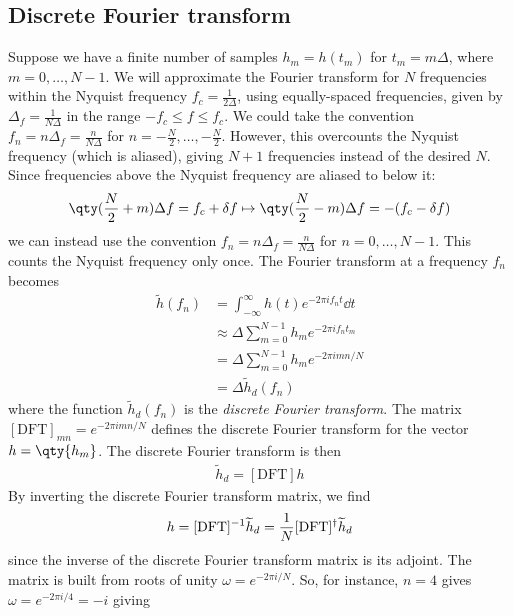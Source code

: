 \subsection{Discrete Fourier transform}
Suppose we have a finite number of samples $h_m = h(t_m)$ for $t_m = m \Delta$, where $m = 0,\dots, N-1$.
We will approximate the Fourier transform for $N$ frequencies within the Nyquist frequency $f_c = \frac{1}{2\Delta}$, using equally-spaced frequencies, given by $\Delta_f = \frac{1}{N\Delta}$ in the range $-f_c \leq f \leq f_c$.
We could take the convention $f_n = n \Delta_f = \frac{n}{N\Delta}$ for $n = -\frac{N}{2}, \dots, -\frac{N}{2}$.
However, this overcounts the Nyquist frequency (which is aliased), giving $N + 1$ frequencies instead of the desired $N$.
Since frequencies above the Nyquist frequency are aliased to below it:
\begin{align*}
	\qty(\frac{N}{2} + m) \Delta f = f_c + \delta f \mapsto \qty(\frac{N}{2} - m)\Delta f = -(f_c - \delta f)
\end{align*}
we can instead use the convention $f_n = n \Delta_f = \frac{n}{N\Delta}$ for $n = 0, \dots, N - 1$.
This counts the Nyquist frequency only once.
The Fourier transform at a frequency $f_n$ becomes
\begin{align*}
	\widetilde h(f_n) & = \int_{-\infty}^\infty h(t) e^{-2\pi if_n t} \dd{t}    \\
	                  & \approx \Delta \sum_{m=0}^{N-1} h_m e^{-2\pi i f_n t_m} \\
	                  & = \Delta \sum_{m=0}^{N-1} h_m e^{-2\pi i m n / N}       \\
	                  & = \Delta \widetilde h_d(f_n)
\end{align*}
where the function $\widetilde h_d(f_n)$ is the \textit{discrete Fourier transform}.
The matrix $[\mathrm{DFT}]_{mn} = e^{-2\pi i m n / N}$ defines the discrete Fourier transform for the vector $h = \qty{h_m}$.
The discrete Fourier transform is then
\begin{align*}
	\widetilde h_d = [\mathrm{DFT}] h
\end{align*}
By inverting the discrete Fourier transform matrix, we find
\begin{align*}
	h = [\mathrm{DFT}]^{-1} \widetilde h_d = \frac{1}{N} [\mathrm{DFT}]^\dagger \widetilde h_d
\end{align*}
since the inverse of the discrete Fourier transform matrix is its adjoint.
The matrix is built from roots of unity $\omega = e^{-2\pi i/N}$.
So, for instance, $n = 4$ gives $\omega = e^{-2\pi i/4} = -i$ giving
